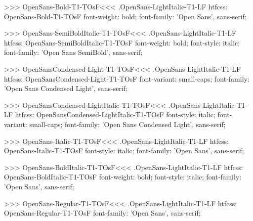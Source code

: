 >>>
\<OpenSans-Bold-T1-TOsF\><<<
.OpenSans-LightItalic-T1-LF
htfcss:  OpenSans-Bold-T1-TOsF  font-weight: bold; font-family: 'Open Sans', sans-serif;

>>>
\<OpenSans-SemiBoldItalic-T1-TOsF\><<<
.OpenSans-LightItalic-T1-LF
htfcss:  OpenSans-SemiBoldItalic-T1-TOsF  font-weight: bold; font-style: italic; font-family: 'Open Sans SemiBold', sans-serif;

>>>
\<OpenSansCondensed-Light-T1-TOsF\><<<
.OpenSans-LightItalic-T1-LF
htfcss:  OpenSansCondensed-Light-T1-TOsF  font-variant: small-caps; font-family: 'Open Sans Condensed Light', sans-serif;

>>>
\<OpenSansCondensed-LightItalic-T1-TOsF\><<<
.OpenSans-LightItalic-T1-LF
htfcss:  OpenSansCondensed-LightItalic-T1-TOsF  font-style: italic; font-variant: small-caps; font-family: 'Open Sans Condensed Light', sans-serif;

>>>
\<OpenSans-Italic-T1-TOsF\><<<
.OpenSans-LightItalic-T1-LF
htfcss:  OpenSans-Italic-T1-TOsF  font-style: italic; font-family: 'Open Sans', sans-serif;

>>>
\<OpenSans-BoldItalic-T1-TOsF\><<<
.OpenSans-LightItalic-T1-LF
htfcss:  OpenSans-BoldItalic-T1-TOsF  font-weight: bold; font-style: italic; font-family: 'Open Sans', sans-serif;

>>>
\<OpenSans-Regular-T1-TOsF\><<<
.OpenSans-LightItalic-T1-LF
htfcss:  OpenSans-Regular-T1-TOsF  font-family: 'Open Sans', sans-serif;

